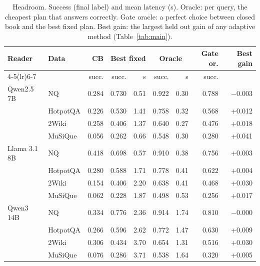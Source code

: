 \begin{table}[t]
\centering
\caption{Headroom. Success (final label) and mean latency (s). Oracle: per query, the cheapest plan that answers correctly. Gate oracle: a perfect choice between closed book and the best fixed plan. Best gain: the largest held out gain of any adaptive method (Table~\ref{tab:main}).}
\label{tab:headroom}
\scriptsize
\setlength{\tabcolsep}{2.5pt}
\begin{tabular}{llrrrrrrr}
\toprule
Reader & Data & CB & \multicolumn{2}{c}{Best fixed} & \multicolumn{2}{c}{Oracle} & Gate or. & Best gain \\
\cmidrule(lr){4-5}\cmidrule(lr){6-7}
 & & succ. & succ. & s & succ. & s & succ. & \\
\midrule
Qwen2.5 7B & NQ & 0.284 & 0.730 & 0.51 & 0.922 & 0.30 & 0.788 & $-$0.003 \\
 & HotpotQA & 0.226 & 0.530 & 1.41 & 0.758 & 0.32 & 0.568 & +0.012 \\
 & 2Wiki & 0.258 & 0.406 & 1.37 & 0.640 & 0.27 & 0.476 & +0.018 \\
 & MuSiQue & 0.056 & 0.262 & 0.66 & 0.548 & 0.30 & 0.280 & +0.041 \\
\midrule
Llama 3.1 8B & NQ & 0.418 & 0.698 & 0.57 & 0.910 & 0.38 & 0.756 & +0.003 \\
 & HotpotQA & 0.280 & 0.588 & 1.71 & 0.778 & 0.41 & 0.622 & +0.004 \\
 & 2Wiki & 0.154 & 0.406 & 2.20 & 0.638 & 0.41 & 0.468 & +0.030 \\
 & MuSiQue & 0.062 & 0.228 & 1.87 & 0.498 & 0.53 & 0.256 & +0.017 \\
\midrule
Qwen3 14B & NQ & 0.334 & 0.776 & 2.36 & 0.914 & 1.74 & 0.810 & $-$0.000 \\
 & HotpotQA & 0.266 & 0.596 & 2.62 & 0.772 & 1.47 & 0.630 & +0.009 \\
 & 2Wiki & 0.306 & 0.434 & 3.70 & 0.654 & 1.31 & 0.516 & +0.030 \\
 & MuSiQue & 0.076 & 0.286 & 3.71 & 0.538 & 1.64 & 0.320 & +0.005 \\
\bottomrule
\end{tabular}
\end{table}